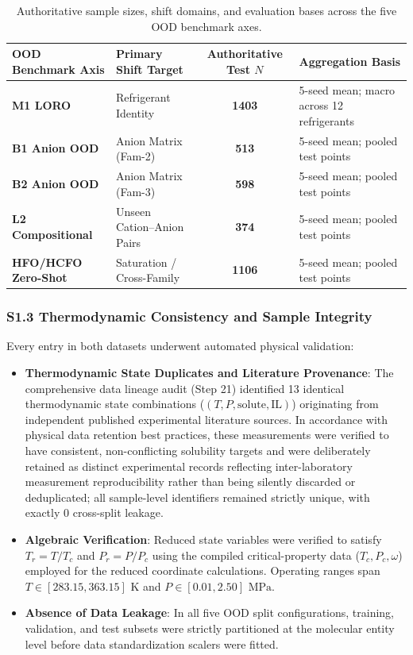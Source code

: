 \begin{table}[htbp]
\centering
\small
\caption{Authoritative sample sizes, shift domains, and evaluation bases across the five OOD benchmark axes.}
\label{tab:si_sample_audit}
\begin{tabular}{llcl}
\toprule
\textbf{OOD Benchmark Axis} & \textbf{Primary Shift Target} & \textbf{Authoritative Test $N$} & \textbf{Aggregation Basis} \\
\midrule
\textbf{M1 LORO} & Refrigerant Identity & \textbf{1403} & 5-seed mean; macro across 12 refrigerants \\
\textbf{B1 Anion OOD} & Anion Matrix (Fam-2) & \textbf{513} & 5-seed mean; pooled test points \\
\textbf{B2 Anion OOD} & Anion Matrix (Fam-3) & \textbf{598} & 5-seed mean; pooled test points \\
\textbf{L2 Compositional} & Unseen Cation--Anion Pairs & \textbf{374} & 5-seed mean; pooled test points \\
\textbf{HFO/HCFO Zero-Shot} & Saturation / Cross-Family & \textbf{1106} & 5-seed mean; pooled test points \\
\bottomrule
\end{tabular}
\end{table}

\subsubsection*{S1.3 Thermodynamic Consistency and Sample Integrity}
Every entry in both datasets underwent automated physical validation:
\begin{itemize}
    \item \textbf{Thermodynamic State Duplicates and Literature Provenance}: The comprehensive data lineage audit (Step 21) identified 13 identical thermodynamic state combinations ($(T, P, \text{solute}, \text{IL})$) originating from independent published experimental literature sources. In accordance with physical data retention best practices, these measurements were verified to have consistent, non-conflicting solubility targets and were deliberately retained as distinct experimental records reflecting inter-laboratory measurement reproducibility rather than being silently discarded or deduplicated; all sample-level identifiers remained strictly unique, with exactly 0 cross-split leakage.
    \item \textbf{Algebraic Verification}: Reduced state variables were verified to satisfy $T_r = T / T_c$ and $P_r = P / P_c$ using the compiled critical-property data ($T_c, P_c, \omega$) employed for the reduced coordinate calculations. Operating ranges span $T \in [283.15, 363.15]\text{ K}$ and $P \in [0.01, 2.50]\text{ MPa}$.
    \item \textbf{Absence of Data Leakage}: In all five OOD split configurations, training, validation, and test subsets were strictly partitioned at the molecular entity level before data standardization scalers were fitted.
\end{itemize}

